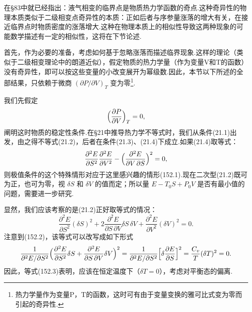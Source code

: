 在§83中就已经指出：液气相变的临界点是物质热力学函数的奇点.这种奇异性的物理本质类似于二级相变点奇异性的本质：正如后者与序参量涨落的增大有关，在接近临界点时物质密度的涨落增大.这种在物理本质上的相似性导致这两种现象的可能数学描述有一定的相似性，这将在下节论述.

首先，作为必要的准备，考虑如何基于忽略涨落而描述临界现象.这样的理论（类似于二级相变理论中的朗道近似），假定物质的热力学量（作为变量V和T的函数）没有奇异性，即可以按这些变量的小改变展开为幂级数.因此，本节以下所述的全部结果，只依赖于微商 $(\partial P/\partial V)_T$ 变为零\footnote{热力学量作为变量P，T的函数，这时可有由于变量变换的雅可比式变为零而引起的奇异性.}.

我们先假定
\begin{equation}
  \Bigl(\frac{\partial P}{\partial V}\Bigr)_T=0,
\end{equation}
阐明这时物质的稳定性条件.在§21中推导热力学不等式时，我们从条件(21.1)出发，由之得不等式(21.2)，后者在条件(21.3)、(21.4)下成立.如果(21.4)取等式：
\begin{equation}
  \frac{\partial^2E}{\partial S^2}\frac{\partial^2E}{\partial V^2}
  -\Bigl(\frac{\partial^2E}{\partial V\,\partial S}\Bigr)^2=0,
\end{equation}
则极值条件的这个特殊情形对应于这里感兴趣的情形(152.1).现在二次型(21.2)既可为正，也可为零，视 $\delta S$ 和 $\delta V$ 的值而定；所以量 $E-T_0S+P_0V$ 是否有最小值的问题，需要进一步研究.

显然，我们应该考察的是(21.2)正好取等式的情况：
\begin{equation}
  \frac{\partial^2E}{\partial S^2}(\delta S)^2
  +2\frac{\partial^2E}{\partial S\,\partial V}\delta S\,\delta V
  +\frac{\partial^2E}{\partial V^2}(\delta V)^2=0.
\end{equation}
注意到(152.2)，该等式可以改写成如下形式
\begin{equation*}
  \frac{1}{\partial^2E/\partial S^2}\Bigl(\frac{\partial^2E}{\partial S^2}\delta S
  +\frac{\partial^2E}{\partial S\,\partial V}\delta V\Bigr)^2
  =\frac{1}{\partial^2E/\partial S^2}
  \Bigl[\delta\frac{\partial E}{\partial S}\Bigr]^2
  =\frac{C_v}{T}(\delta T)^2=0.
\end{equation*}
因此，等式(152.3)表明，应该在恒定温度下（$\delta T=0$），考虑对平衡态的偏离.

